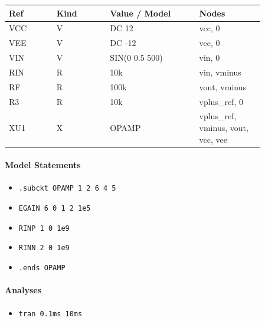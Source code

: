 \begin{longtable}{p{0.16\linewidth}p{0.18\linewidth}p{0.30\linewidth}p{0.22\linewidth}}
\textbf{Ref} & \textbf{Kind} & \textbf{Value / Model} & \textbf{Nodes}\\
\hline
VCC & V & DC 12 & vcc, 0\\
VEE & V & DC -12 & vee, 0\\
VIN & V & SIN(0 0.5 500) & vin, 0\\
RIN & R & 10k & vin, vminus\\
RF & R & 100k & vout, vminus\\
R3 & R & 10k & vplus\_ref, 0\\
XU1 & X & OPAMP & vplus\_ref, vminus, vout, vcc, vee\\
\end{longtable}

\paragraph{Model Statements}
\begin{itemize}
  \item \texttt{.subckt OPAMP 1 2 6 4 5}
  \item \texttt{EGAIN 6 0 1 2 1e5}
  \item \texttt{RINP 1 0 1e9}
  \item \texttt{RINN 2 0 1e9}
  \item \texttt{.ends OPAMP}
\end{itemize}

\paragraph{Analyses}
\begin{itemize}
  \item \texttt{tran 0.1ms 10ms}
\end{itemize}
